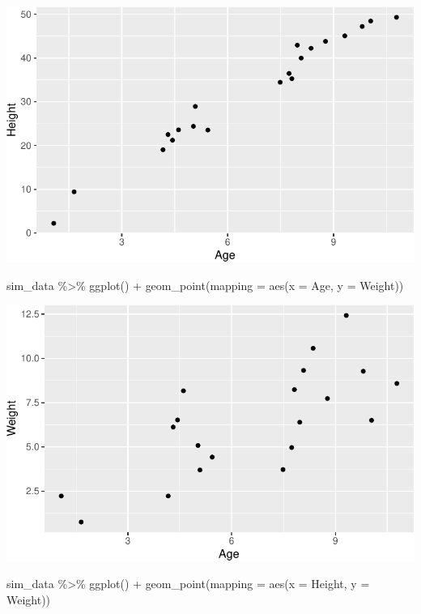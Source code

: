 \documentclass[
  letterpaper,
  DIV=11,
  numbers=noendperiod]{scrartcl}
\newenvironment{Shaded}{\begin{snugshade}}{\end{snugshade}}
\newcommand{\AttributeTok}[1]{\textcolor[rgb]{0.40,0.45,0.13}{#1}}
\newcommand{\FunctionTok}[1]{\textcolor[rgb]{0.28,0.35,0.67}{#1}}
\newcommand{\NormalTok}[1]{\textcolor[rgb]{0.00,0.23,0.31}{#1}}
\newcommand{\SpecialCharTok}[1]{\textcolor[rgb]{0.37,0.37,0.37}{#1}}
\begin{document}
\includegraphics{week-2-homework_files/figure-pdf/unnamed-chunk-5-1.pdf}

\begin{Shaded}
\begin{Highlighting}[]
\NormalTok{sim\_data }\SpecialCharTok{\%\textgreater{}\%} 
    \FunctionTok{ggplot}\NormalTok{() }\SpecialCharTok{+}
    \FunctionTok{geom\_point}\NormalTok{(}\AttributeTok{mapping =} \FunctionTok{aes}\NormalTok{(}\AttributeTok{x =}\NormalTok{ Age, }\AttributeTok{y =}\NormalTok{ Weight))}
\end{Highlighting}
\end{Shaded}

\includegraphics{week-2-homework_files/figure-pdf/unnamed-chunk-6-1.pdf}

\begin{Shaded}
\begin{Highlighting}[]
\NormalTok{sim\_data }\SpecialCharTok{\%\textgreater{}\%} 
    \FunctionTok{ggplot}\NormalTok{() }\SpecialCharTok{+}
    \FunctionTok{geom\_point}\NormalTok{(}\AttributeTok{mapping =} \FunctionTok{aes}\NormalTok{(}\AttributeTok{x =}\NormalTok{ Height, }\AttributeTok{y =}\NormalTok{ Weight))}
\end{Highlighting}
\end{Shaded}
\end{document}
